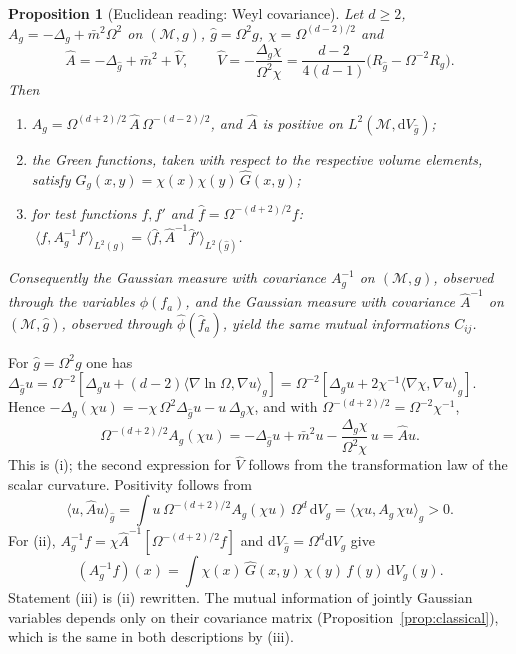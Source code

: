 \documentclass[11pt,a4paper]{article}
\makeatletter
\theoremstyle{stmt}
\newtheorem{proposition}[theorem]{Proposition}
\theoremstyle{defn}
\theoremstyle{rmk}
\renewenvironment{proof}[1][\proofname]{\par\pushQED{\qed}\normalfont\topsep6\p@\@plus6\p@\relax
  \trivlist\item[\hskip\labelsep{\sffamily\itshape\small #1.}]\ignorespaces}{\popQED\endtrivlist\@endpefalse}
\numberwithin{equation}{section}
\newcommand{\M}{\mathcal{M}}
\newcommand{\dd}{\mathrm{d}}
\makeatother
\begin{document}
\begin{proposition}[Euclidean reading: Weyl covariance]\label{prop:weyl}
Let $d\ge2$, $A_g=-\Delta_g+\bar m^2\Omega^2$ on $(\M,g)$, $\hat g=\Omega^2g$, $\chi=\Omega^{(d-2)/2}$ and
\begin{equation}\label{eq:Vhat}
\hat A=-\Delta_{\hat g}+\bar m^2+\hat V,\qquad \hat V=-\frac{\Delta_g\chi}{\Omega^2\chi}=\frac{d-2}{4(d-1)}\big(R_{\hat g}-\Omega^{-2}R_g\big).
\end{equation}
Then
\begin{enumerate}[label=\textup{(\roman*)}]
\item $A_g=\Omega^{(d+2)/2}\,\hat A\,\Omega^{-(d-2)/2}$, and $\hat A$ is positive on $L^2(\M,\dd V_{\hat g})$;
\item the Green functions, taken with respect to the respective volume elements, satisfy $G_g(x,y)=\chi(x)\chi(y)\,\hat G(x,y)$;
\item for test functions $f,f'$ and $\hat f=\Omega^{-(d+2)/2}f$: $\ \langle f,A_g^{-1}f'\rangle_{L^2(g)}=\langle\hat f,\hat A^{-1}\hat f'\rangle_{L^2(\hat g)}$.
\end{enumerate}
Consequently the Gaussian measure with covariance $A_g^{-1}$ on $(\M,g)$, observed through the variables $\phi(f_a)$, and the Gaussian measure with covariance $\hat A^{-1}$ on $(\M,\hat g)$, observed through $\hat\phi(\hat f_a)$, yield the same mutual informations $C_{ij}$.
\end{proposition}

\begin{proof}
For $\hat g=\Omega^2g$ one has $\Delta_{\hat g}u=\Omega^{-2}[\Delta_gu+(d-2)\langle\nabla\ln\Omega,\nabla u\rangle_g]=\Omega^{-2}[\Delta_gu+2\chi^{-1}\langle\nabla\chi,\nabla u\rangle_g]$. Hence $-\Delta_g(\chi u)=-\chi\,\Omega^2\Delta_{\hat g}u-u\,\Delta_g\chi$, and with $\Omega^{-(d+2)/2}=\Omega^{-2}\chi^{-1}$,
\[
\Omega^{-(d+2)/2}A_g(\chi u)=-\Delta_{\hat g}u+\bar m^2u-\frac{\Delta_g\chi}{\Omega^2\chi}\,u=\hat Au .
\]
This is (i); the second expression for $\hat V$ follows from the transformation law of the scalar curvature. Positivity follows from
\[
\langle u,\hat Au\rangle_{\hat g}=\int u\,\Omega^{-(d+2)/2}A_g(\chi u)\,\Omega^d\,\dd V_g=\langle\chi u,A_g\,\chi u\rangle_g>0 .
\]
For (ii), $A_g^{-1}f=\chi\hat A^{-1}[\Omega^{-(d+2)/2}f]$ and $\dd V_{\hat g}=\Omega^d\dd V_g$ give
\[
(A_g^{-1}f)(x)=\int\chi(x)\,\hat G(x,y)\,\chi(y)\,f(y)\,\dd V_g(y).
\] Statement (iii) is (ii) rewritten. The mutual information of jointly Gaussian variables depends only on their covariance matrix (Proposition~\ref{prop:classical}), which is the same in both descriptions by (iii).
\end{proof}
\end{document}

